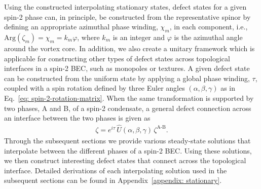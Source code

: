 Using the constructed interpolating stationary states, defect states for a given
spin-2 phase can, in principle, be constructed from
the representative spinor by defining an appropriate azimuthal phase winding,
\(\chi_m \), in each component, i.e., \(\text{Arg}(\zeta_m) =\chi_m =
k_m\varphi \), where \(k_m\) is an integer and \(\varphi \) is the azimuthal
angle around the vortex core.
In addition, we also create a unitary framework which is applicable for
constructing other types of defect states across topological interfaces in a
spin-2 BEC, such as monopoles or textures.
A given defect state can be constructed from the uniform state by applying a
global phase winding, \(\tau \), coupled with a spin rotation defined by three
Euler angles \((\alpha, \beta, \gamma)\) as in
Eq.~\eqref{eq: spin-2-rotation-matrix}.
When the same transformation is supported by two phases, A and B, of a spin-2
condensate, a general defect connection across an interface between the two
phases is given as
\begin{align}\label{eq: general-defect-interface}
    \zeta = e^{i\tau}\,\hat{U}(\alpha, \beta, \gamma)\,\zeta^\text{A-B}.
\end{align}
Through the subsequent sections we provide various steady-state solutions that
interpolate between the different phases of a spin-2 BEC.\@
Using these solutions, we then construct interesting defect states that connect
across the topological interface.
Detailed derivations of each interpolating solution used in the subsequent
sections can be found in Appendix~\ref{appendix: stationary}.

